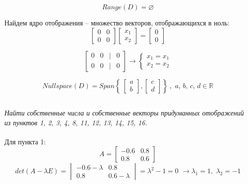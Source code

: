 \documentclass[a5paper, 10pt]{article}
\theoremstyle{definition}
\theoremstyle{plain}
\theoremstyle{remark}
\begin{document}
\begin{equation}
Range(D) = \varnothing
\end{equation}

Найдем ядро отображения -- множество векторов, отображающихся в ноль:
\begin{equation}
\begin{bmatrix}
0 & 0\\
0 & 0
\end{bmatrix}
\begin{bmatrix}
x_1\\
x_2
\end{bmatrix}
=
\begin{bmatrix}
0\\
0
\end{bmatrix}
\end{equation}

\begin{equation}
\begin{bmatrix}
0 & 0 & | & 0\\
0 & 0 & | & 0
\end{bmatrix}
\to
\begin{cases}
x_1 = x_1\\
x_2 = x_2
\end{cases}
\end{equation}

\begin{equation}
Nullspace (D) = Span
 \left\{\
\begin{bmatrix}
a\\
b
\end{bmatrix}
,
\begin{bmatrix}
c\\
d
\end{bmatrix}
\right\}\
, \,\,  a, \, b, \, c, \, d \in \mathbb{R}
\end{equation}



\subsection{}
\textit{Найти собственные числа и собственные векторы придуманных отображений из пунктов 1, 2, 3, 4, 8, 11, 12, 13, 14, 15, 16.}\\
\\
Для пункта 1:
\begin{equation}
A =
\begin{bmatrix}
-0.6 & 0.8\\
0.8 & 0.6
\end{bmatrix}
\end{equation}
\begin{equation}
det(A - \lambda E) =
\begin{vmatrix}
-0.6 - \lambda & 0.8\\
0.8 & 0.6 - \lambda
\end{vmatrix}
 = \lambda^2 - 1 = 0 \, \, \to \lambda_1 = 1, \, \, \lambda_2 = -1
\end{equation}
\end{document}
